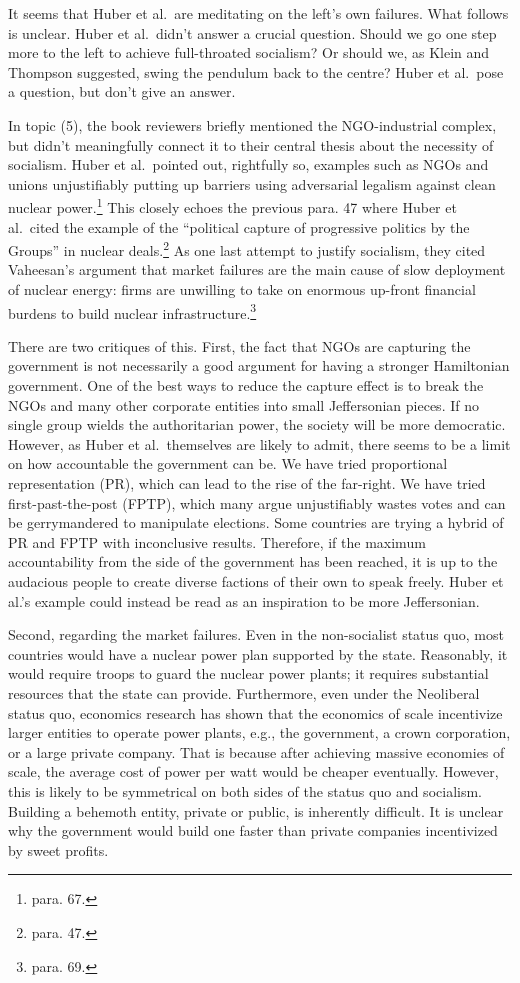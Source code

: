 \documentclass[12pt]{article}
\begin{document}
It seems that Huber et al.\ are meditating on the left's own failures. What follows is unclear. Huber et al.\ didn't answer a crucial question. Should we go one step more to the left to achieve full-throated socialism? Or should we, as Klein and Thompson suggested, swing the pendulum back to the centre? Huber et al.\ pose a question, but don't give an answer.

In topic (5), the book reviewers briefly mentioned the NGO-industrial complex, but didn't meaningfully connect it to their central thesis about the necessity of socialism. Huber et al.\ pointed out, rightfully so, examples such as NGOs and unions unjustifiably putting up barriers using adversarial legalism against clean nuclear power.\footnote{para. 67.} This closely echoes the previous para. 47 where Huber et al.\ cited the example of the ``political capture of progressive politics by the Groups'' in nuclear deals.\footnote{para. 47.} As one last attempt to justify socialism, they cited Vaheesan's argument that market failures are the main cause of slow deployment of nuclear energy: firms are unwilling to take on enormous up-front financial burdens to build nuclear infrastructure.\footnote{para. 69.}

There are two critiques of this. First, the fact that NGOs are capturing the government is not necessarily a good argument for having a stronger Hamiltonian government. One of the best ways to reduce the capture effect is to break the NGOs and many other corporate entities into small Jeffersonian pieces. If no single group wields the authoritarian power, the society will be more democratic. However, as Huber et al.\ themselves are likely to admit, there seems to be a limit on how accountable the government can be. We have tried proportional representation (PR), which can lead to the rise of the far-right. We have tried first-past-the-post (FPTP), which many argue unjustifiably wastes votes and can be gerrymandered to manipulate elections. Some countries are trying a hybrid of PR and FPTP with inconclusive results. Therefore, if the maximum accountability from the side of the government has been reached, it is up to the audacious people to create diverse factions of their own to speak freely. Huber et al.'s example could instead be read as an inspiration to be more Jeffersonian.

Second, regarding the market failures. Even in the non-socialist status quo, most countries would have a nuclear power plan supported by the state. Reasonably, it would require troops to guard the nuclear power plants; it requires substantial resources that the state can provide. Furthermore, even under the Neoliberal status quo, economics research has shown that the economics of scale incentivize larger entities to operate power plants, e.g., the government, a crown corporation, or a large private company. That is because after achieving massive economies of scale, the average cost of power per watt would be cheaper eventually. However, this is likely to be symmetrical on both sides of the status quo and socialism. Building a behemoth entity, private or public, is inherently difficult. It is unclear why the government would build one faster than private companies incentivized by sweet profits.
\end{document}
